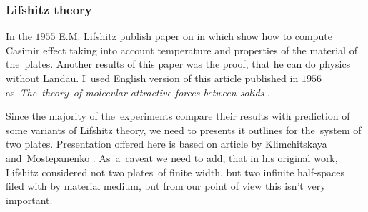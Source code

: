 \documentclass[10pt,t]{beamer}
\begin{document}
\begin{frame}
  \frametitle{Lifshitz theory}


  In the $1955$ E.M. Lifshitz publish paper on in which show how to compute
  Casimir effect taking into account temperature and properties of the
  material of the~plates. Another results of this paper was the proof, that
  he can do physics without Landau. I~used English version of this article
  published in $1956$
  as~\textit{The~theory~of molecular attractive forces between solids}
  \parencite{Lifshitz-The-theory-of-molecular-ETC-Pub-1956}.


  Since the majority of the~experiments compare their results with
  prediction of some variants of Lifshitz theory, we need to presents it
  outlines for the~system of two plates. Presentation offered here is based
  on article by Klimchitskaya and~Mostepanenko
  \parencite{Klimchitskaya-Mostepanenko-Current-status-ETC-Pub-2022}.
  As~a~caveat we need to add, that in his original work, Lifshitz
  considered not two plates~of finite width, but two infinite half-spaces
  filed with by material medium, but from our point of view this isn't
  very important.

\end{frame}
\end{document}

